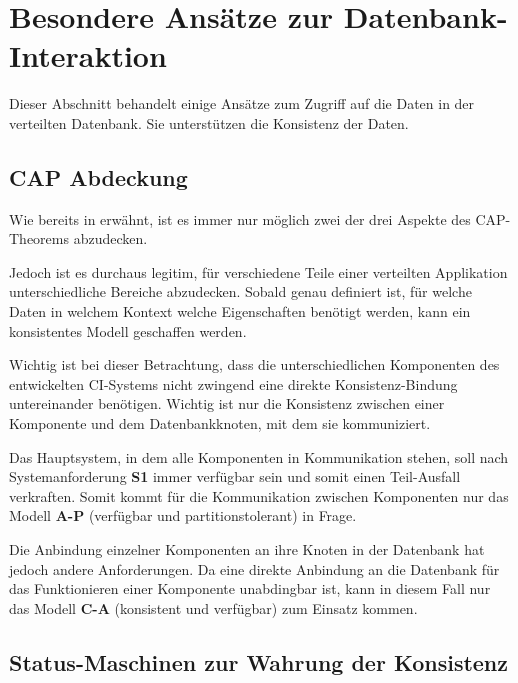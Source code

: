 \section{Besondere Ansätze zur Datenbank-Interaktion}
\label{sec:design:bes-ansaetze}

Dieser Abschnitt behandelt einige Ansätze zum Zugriff auf die Daten in der verteilten Datenbank.
Sie unterstützen die Konsistenz der Daten.



\subsection{CAP Abdeckung}

Wie bereits in  erwähnt,
ist es immer nur möglich zwei der drei Aspekte des CAP-Theorems abzudecken.

Jedoch ist es durchaus legitim, für verschiedene Teile
einer verteilten Applikation unterschiedliche Bereiche abzudecken.
Sobald genau definiert ist, für welche Daten in welchem Kontext welche Eigenschaften benötigt werden,
kann ein konsistentes Modell geschaffen werden.

Wichtig ist bei dieser Betrachtung, dass die unterschiedlichen Komponenten des entwickelten \ac{CI}-Systems
nicht zwingend eine direkte Konsistenz-Bindung untereinander benötigen.
Wichtig ist nur die Konsistenz zwischen einer Komponente
und dem Datenbankknoten, mit dem sie kommuniziert.

Das Hauptsystem, in dem alle Komponenten in Kommunikation stehen,
soll nach Systemanforderung \textbf{S1} immer verfügbar sein und somit einen Teil-Ausfall  verkraften.
Somit kommt für die Kommunikation zwischen Komponenten nur das Modell
\textbf{A-P} (verfügbar und partitionstolerant) in Frage.

Die Anbindung einzelner Komponenten an ihre Knoten in der Datenbank hat jedoch andere Anforderungen.
Da eine direkte Anbindung an die Datenbank für das Funktionieren einer Komponente unabdingbar ist,
kann in diesem Fall nur das Modell \textbf{C-A} (konsistent und verfügbar) zum Einsatz kommen.



\subsection{Status-Maschinen zur Wahrung der Konsistenz}

